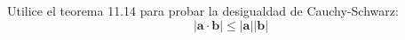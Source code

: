 \item Utilice el teorema 11.14 para probar la desigualdad de Cauchy-Schwarz: 
    \[
    |\mathbf{a} \cdot \mathbf{b}| \leqslant |\mathbf{a}| |\mathbf{b}|
    \]
